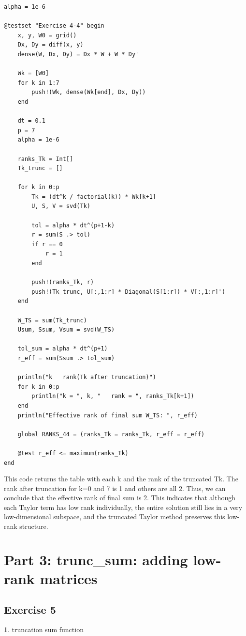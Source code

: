 \documentclass[11pt]{article}
\begin{document}
\begin{lstlisting}
alpha = 1e-6

@testset "Exercise 4-4" begin
    x, y, W0 = grid()
    Dx, Dy = diff(x, y)
    dense(W, Dx, Dy) = Dx * W + W * Dy'

    Wk = [W0]
    for k in 1:7
        push!(Wk, dense(Wk[end], Dx, Dy))
    end

    dt = 0.1
    p = 7
    alpha = 1e-6

    ranks_Tk = Int[]
    Tk_trunc = []

    for k in 0:p
        Tk = (dt^k / factorial(k)) * Wk[k+1]
        U, S, V = svd(Tk)

        tol = alpha * dt^(p+1-k)
        r = sum(S .> tol)
        if r == 0
            r = 1
        end

        push!(ranks_Tk, r)
        push!(Tk_trunc, U[:,1:r] * Diagonal(S[1:r]) * V[:,1:r]')
    end

    W_TS = sum(Tk_trunc)
    Usum, Ssum, Vsum = svd(W_TS)

    tol_sum = alpha * dt^(p+1)
    r_eff = sum(Ssum .> tol_sum)

    println("k   rank(Tk after truncation)")
    for k in 0:p
        println("k = ", k, "   rank = ", ranks_Tk[k+1])
    end
    println("Effective rank of final sum W_TS: ", r_eff)

    global RANKS_44 = (ranks_Tk = ranks_Tk, r_eff = r_eff)

    @test r_eff <= maximum(ranks_Tk)
end

\end{lstlisting}

This code returns the table with each k and the rank of the truncated Tk. The rank after truncation for k=0 and 7 is 1 and others are all 2. Thus, we can conclude that the effective rank of final sum is 2. This indicates that although each Taylor term has low rank individually, the entire solution still lies in a very low-dimensional subspace, and the truncated Taylor method preserves this low-rank structure.

\section*{Part 3: trunc\_sum: adding low-rank matrices}
\subsection*{Exercise 5}
\textbf{1}. truncation sum function
\end{document}
